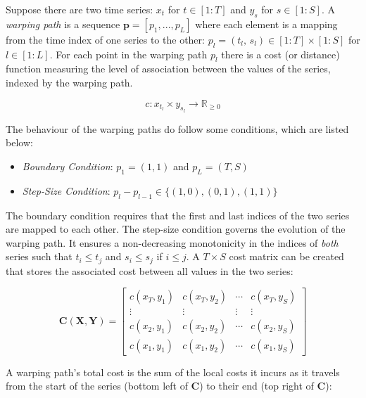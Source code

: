 \documentclass[12pt]{article}
\begin{document}
Suppose there are two time series: $x_{t}$ for $t \in [1:T]$ and $y_{s}$ for $s \in [1:S]$. A \emph{warping path} is a sequence $\boldsymbol{p} = [p_{1},..., p_{L}]$ where each element is a mapping from the time index of one series to the other: $p_{l} = (t_{l}, \, s_{l}) \in [1:T] \times [1:S]$ for $l \in [1:L]$. For each point in the warping path $p_{l}$ there is a cost (or distance) function measuring the level of association between the values of the series, indexed by the warping path.

\begin{equation}
    c: x_{t_{l}} \times y_{s_{l}} \rightarrow \mathbb{R}_{\ge 0}
\end{equation}

The behaviour of the warping paths do follow some conditions, which are listed below:

\begin{itemize}
    \item \emph{Boundary Condition}: $p_{1} = (1, 1)$ and $p_{L} = (T, S)$ 
    \item \emph{Step-Size Condition}: $p_{l} - p_{l - 1} \in \{ (1, 0), (0, 1), (1, 1) \} $
\end{itemize}

The boundary condition requires that the first and last indices of the two series are mapped to each other. The step-size condition governs the evolution of the warping path. It ensures a non-decreasing monotonicity in the indices of \emph{both} series such that $t_{i} \le t_{j}$ and $s_{i} \le s_{j}$ if $i \le j$. A $T \times S$ cost matrix can be created that stores the associated cost between all values in the two series:

\begin{equation}
    \mathbf{C}(\boldsymbol{X}, \boldsymbol{Y}) = \left[ 
        \begin{array}{cccc}
            c(x_{T}, y_{1}) & c(x_{T}, y_{2}) & \cdots & c(x_{T}, y_{S}) \\ 
            \vdots          & \vdots          & \vdots & \vdots          \\
            c(x_{2}, y_{1}) & c(x_{2}, y_{2}) & \cdots & c(x_{2}, y_{S}) \\ 
            c(x_{1}, y_{1}) & c(x_{1}, y_{2}) & \cdots & c(x_{1}, y_{S})
    \end{array}\right]
\end{equation}

A warping path's total cost is the sum of the local costs it incurs as it travels from the start of the series (bottom left of $\boldsymbol{C}$) to their end (top right of $\boldsymbol{C}$):
\end{document}
